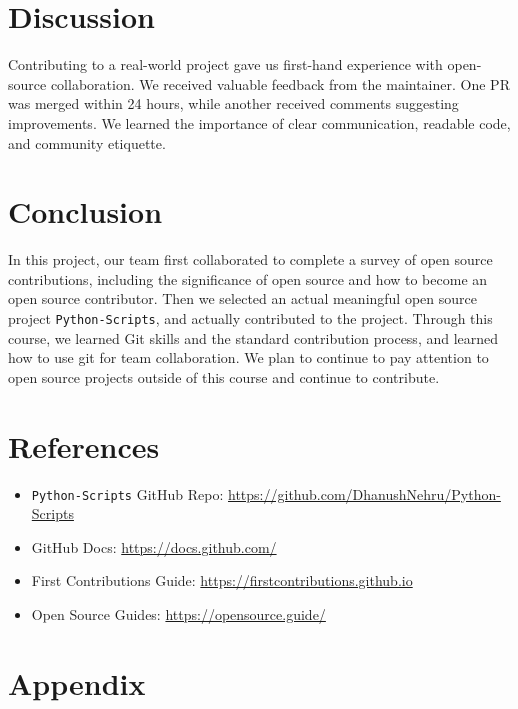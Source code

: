 \documentclass[12pt]{article}
\begin{document}
\section{Discussion}

Contributing to a real-world project gave us first-hand experience with open-source collaboration. We received valuable feedback from the maintainer. One PR was merged within 24 hours, while another received comments suggesting improvements. We learned the importance of clear communication, readable code, and community etiquette.

\section{Conclusion}
In this project, our team first collaborated to complete a survey of open source contributions, including the significance of open source and how to become an open source contributor. Then we selected an actual meaningful open source project \texttt{Python-Scripts}, and actually contributed to the project. Through this course, we learned Git skills and the standard contribution process, and learned how to use git for team collaboration. We plan to continue to pay attention to open source projects outside of this course and continue to contribute.


\section*{References}
\begin{itemize}
    \item \texttt{Python-Scripts} GitHub Repo: \url{https://github.com/DhanushNehru/Python-Scripts}
    \item GitHub Docs: \url{https://docs.github.com/}
    \item First Contributions Guide: \url{https://firstcontributions.github.io}
    \item Open Source Guides: \url{https://opensource.guide/}
\end{itemize}

\newpage
\appendix
\section*{Appendix}
\end{document}
